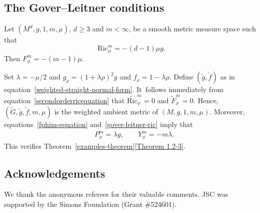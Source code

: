 \documentclass[pdftex]{sigma}
\numberwithin{equation}{section}
\begin{document}
\subsection{The Gover--Leitner conditions}

Let $(M^d,g,1,m,\mu)$, $d\geq 3$ and $m<\infty$, be a smooth metric measure space such that
\begin{equation}
\label{gover-leitner-ric}
\mathrm{Ric}_\phi^m=-(d-1)\mu g.
\end{equation} Then $F_\phi^m=-(m-1)\mu$.

Set $\lambda=-\mu/2$ and $g_\rho=(1+\lambda\rho)^2 g$ and $f_\rho=1-\lambda\rho$. Define $(\widetilde{g},\widetilde{f})$ as in equation~\eqref{weighted-straight-normal-form}. It~follows immediately from equation~\eqref{secondorderricequation} that $\widetilde{\mathrm{Ric}}_\phi^m=0$ and $\widetilde{F}_\phi^m=0$. Hence, $(\widetilde{G},\widetilde{g},\widetilde{f},m,\mu)$ is the weighted ambient metric of $(M,g,1,m,\mu)$. Moreover, equations~\eqref{fphim-equation} and~\eqref{gover-leitner-ric} imply that
\begin{align*}
&P_\phi^m=\lambda g,\qquad
Y_\phi^m=-m\lambda.
\end{align*}
This verifies Theorem~\ref{examples-theorem}\ref{Theorem 1.2-3}.

\subsection*{Acknowledgements}

We thank the anonymous referees for their valuable comments. JSC was supported by the Simons Foundation (Grant \#524601).
\end{document}
